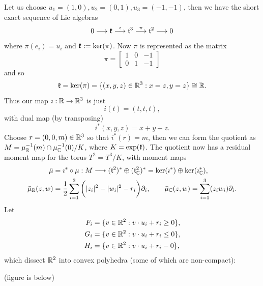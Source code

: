 Let us choose $u_{1} = (1,0), u_{2} = (0,1), u_{3} = (-1,-1)$, then we have the short exact sequence of Lie algebras
\begin{equation*}
	0 \longrightarrow \mathfrak{k} \stackrel{\imath}{\longrightarrow} \mathfrak{t}^{3}
	\stackrel{\pi}{\longrightarrow} \mathfrak{t}^{2} \longrightarrow 0
\end{equation*}
where $\pi(e_{i}) = u_{i}$ and $\mathfrak{k} := \ker(\pi)$. Now $\pi$ is represented as the matrix
\begin{equation*}
	\pi = \begin{bmatrix}
	1 & 0 & -1 \\
	0 & 1 & -1
	\end{bmatrix}
\end{equation*}
and so
\begin{equation*}
	\mathfrak{k} = \ker(\pi) = \{(x,y,z) \in \mathbb{R}^{3} : x = z, y = z \} \cong \mathbb{R}.
\end{equation*}
Thus our map $\imath: \mathbb{R} \rightarrow \mathbb{R}^{3}$ is just
$$
	i(t) = (t,t,t),
$$
with dual map (by transposing)
$$
	i^{\ast}(x,y,z) = x + y + z.
$$
Choose $r = (0,0,m) \in \mathbb{R}^{3}$ so that $i^{\ast}(r) = m$, then we can form the \HK quotient as $M = \mu_{\mathbb{R}}^{-1}(m) \cap \mu_{\mathbb{C}}^{-1}(0)/K$, where $K = \exp(\mathfrak{k})$. The \HK quotient now has a residual moment map for the torus $T^{2} = T^{3}/K$, with moment maps
\begin{equation*}
\begin{split}
\bar{\mu} &= \imath^{\ast} \circ \mu : M \longrightarrow (\mathfrak{t}^{2})^{\ast} \oplus (\mathfrak{t}_{\mathbb{C}}^{2})^{\ast} = \ker(\imath^{\ast}) \oplus \ker(\imath_{\mathbb{C}}^{\ast})  ,\\
\bar{\mu}_{\mathbb{R}}(z,w) &= \frac{1}{2}\sum_{i = 1}^{3}\bigg( |z_{i}|^{2} - |w_{i}|^{2} - r_{i}\bigg)\partial_{i},\qquad
\bar{\mu}_{\mathbb{C}}(z,w) = \sum_{i=1}^{3}(z_{i}w_{i}) \partial_{i}.
\end{split}
\end{equation*}
Let
\begin{equation*}
	\begin{split}
	F_{i} &= \{ v \in \mathbb{R}^{2} : v \cdot u_{i} + r_{i} \geq 0\},\\
	G_{i} &= \{ v \in \mathbb{R}^{2} : v \cdot u_{i} + r_{i} \leq 0\},\\
	H_{i} &= \{ v \in \mathbb{R}^{2} : v \cdot u_{i} + r_{i} - 0\},
	\end{split}
\end{equation*}
which dissect $\mathbb{R}^{2}$ into convex polyhedra (some of which are non-compact):

(figure is below)

